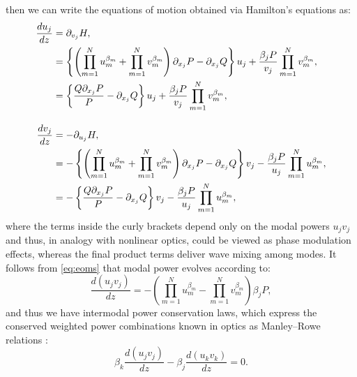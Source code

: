 \documentclass[11pt,a4paper]{article}
\numberwithin{equation}{section}
\begin{document}
then we can write the equations of motion obtained via Hamilton's equations as:
\begin{align}
    \frac{d u_j}{dz} &= \partial_{v_j} H, \notag \\
        &= \left\{\left(\prod_{m=1}^{N} u_{m}^{{\beta}_{m}} + \prod_{m=1}^{N} v_{m}^{{\beta}_{m}}\right) \partial_{x_j} P - \partial_{x_j} Q \right\} u_j + \frac{\beta_j P}{v_j} \prod_{m=1}^{N} v_{m}^{{\beta}_{m}}, \notag \\
        &= \left\{\frac{Q \partial_{x_j} P}{P} - \partial_{x_j} Q \right\} u_j + \frac{\beta_j P}{v_j} \prod_{m=1}^{N} v_{m}^{{\beta}_{m}}, \notag \\[10pt]
    \frac{d v_j}{dz} &= -\partial_{u_j} H, \notag \\
        &= -\left\{\left(\prod_{m=1}^{N} u_{m}^{{\beta}_{m}} + \prod_{m=1}^{N} v_{m}^{{\beta}_{m}}\right) \partial_{x_j} P - \partial_{x_j} Q \right\} v_j - \frac{\beta_j P}{u_j} \prod_{m=1}^{N} u_{m}^{{\beta}_{m}}, \notag \\
        &= -\left\{\frac{Q \partial_{x_j} P}{P} - \partial_{x_j} Q \right\} v_j - \frac{\beta_j P}{u_j} \prod_{m=1}^{N} u_{m}^{{\beta}_{m}}, \label{eq:eoms}
\end{align}
where the terms inside the curly brackets depend only on the modal powers $u_j v_j$ and thus, in analogy with nonlinear optics, could be viewed as phase modulation effects, whereas the final product terms deliver wave mixing among modes. 
It follows from \eqref{eq:eoms} that modal power evolves according to:
\begin{equation}
    \frac{d \left(u_j v_j\right)}{dz} = - \left(\prod_{m=1}^{N} u_{m}^{{\beta}_{m}} - \prod_{m=1}^{N} v_{m}^{{\beta}_{m}}\right) \beta_j P, \label{eq:duvj-u-v-prod-minus}
\end{equation}
and thus we have intermodal power conservation laws, which express the conserved weighted power combinations known in optics as Manley--Rowe relations \cite{armstrongInteractionsLightWaves1962}:
\begin{equation}
    \beta_k \frac{d \left(u_j v_j\right)}{dz} - \beta_j \frac{d \left(u_k v_k\right)}{dz}  = 0. \label{eq:manley-rowe-diff-beta}
\end{equation}
\end{document}
